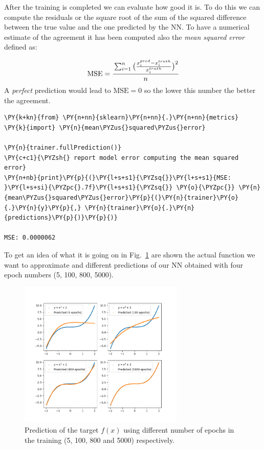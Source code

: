 After the training is completed we can evaluate how good it is. To do
this we can compute the residuals or the square root of the sum of the
squared difference between the true value and the one predicted by the
NN. To have a numerical estimate of the agreement it has been computed also the
\emph{mean squared error} defined as:

\begin{equation}\textrm{MSE} = \cfrac{\sum_{i=1}^n{\big(\frac{x_{i}^{pred} - x_i^{truth}}{x_i^{truth}}\big)^2}}{n}\end{equation}
A \emph{perfect} prediction would lead to \(\textrm{MSE}=0\) so the
lower this number the better the agreement.

\begin{tcolorbox}[breakable, size=fbox, boxrule=1pt, pad at break*=1mm,colback=cellbackground, colframe=cellborder]
\begin{Verbatim}[commandchars=\\\{\}]
\PY{k+kn}{from} \PY{n+nn}{sklearn}\PY{n+nn}{.}\PY{n+nn}{metrics} \PY{k}{import} \PY{n}{mean\PYZus{}squared\PYZus{}error}
	
\PY{n}{trainer.fullPrediction()}
\PY{c+c1}{\PYZsh{} report model error computing the mean squared error}
\PY{n+nb}{print}\PY{p}{(}\PY{l+s+s1}{\PYZsq{}}\PY{l+s+s1}{MSE: }\PY{l+s+si}{\PYZpc{}.7f}\PY{l+s+s1}{\PYZsq{}} \PY{o}{\PYZpc{}} \PY{n}{mean\PYZus{}squared\PYZus{}error}\PY{p}{(}\PY{n}{trainer}\PY{o}{.}\PY{n}{y}\PY{p}{,} \PY{n}{trainer}\PY{o}{.}\PY{n}{predictions}\PY{p}{)}\PY{p}{)}

MSE: 0.0000062
\end{Verbatim}
\end{tcolorbox}

To get an idea of what it is going on in Fig.~\ref{fig:training_vs_epochs} are shown the
actual function we want to approximate and different predictions of our
NN obtained with four epoch numbers (5, 100, 800, 5000).

\begin{figure}[htb]
	\centering
	\includegraphics[width=0.7\textwidth]{figures/training_vs_epoch}
	\caption{Prediction of the target $f(x)$ using different number of epochs in the training (5, 100, 800 and 5000) respectively.}
	\label{fig:training_vs_epochs}
\end{figure}

